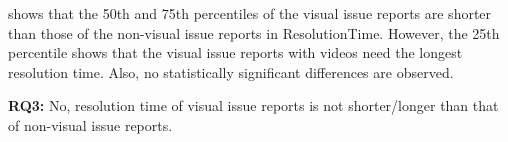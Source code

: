  shows that the 50th and 75th percentiles of the visual issue reports are shorter than those of the non-visual issue reports in ResolutionTime.
However, the 25th percentile shows that the visual issue reports with videos need the longest resolution time. 
Also, no statistically significant differences are observed. 

\summarybox
{{\bf RQ3: }{
    No, resolution time of visual issue reports is not shorter/longer than that of non-visual issue reports.
}}




